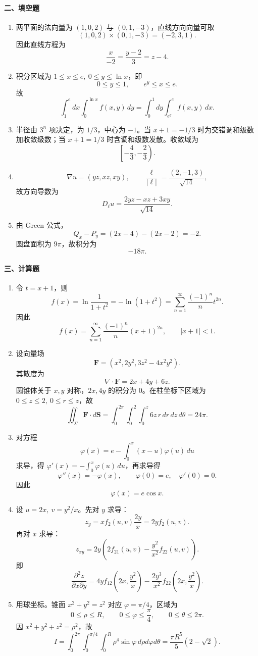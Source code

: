 \paragraph{二、填空题}
\begin{enumerate}
  \item 两平面的法向量为 $(1,0,2)$ 与 $(0,1,-3)$，直线方向向量可取
  \[
  (1,0,2)\times(0,1,-3)=(-2,3,1).
  \]
  因此直线方程为
  \[
  \frac{x}{-2}=\frac{y-2}{3}=z-4.
  \]
  \item 积分区域为 $1\le x\le e,\ 0\le y\le\ln x$，即
  \[
  0\le y\le1,\qquad e^y\le x\le e.
  \]
  故
  \[
  \int_1^e dx\int_0^{\ln x}f(x,y)\,dy
  =\int_0^1dy\int_{e^y}^e f(x,y)\,dx.
  \]
  \item 半径由 $3^n$ 项决定，为 $1/3$，中心为 $-1$。当 $x+1=-1/3$ 时为交错调和级数加收敛级数；当 $x+1=1/3$ 时含调和级数发散。收敛域为
  \[
  \left[-\frac43,-\frac23\right).
  \]
  \item
  \[
  \nabla u=(yz,xz,xy),\qquad
  \frac{\ell}{|\ell|}=\frac{(2,-1,3)}{\sqrt{14}},
  \]
  故方向导数为
  \[
  D_\ell u=\frac{2yz-xz+3xy}{\sqrt{14}}.
  \]
  \item 由 Green 公式，
  \[
  Q_x-P_y=(2x-4)-(2x-2)=-2.
  \]
  圆盘面积为 $9\pi$，故积分为
  \[
  -18\pi.
  \]
\end{enumerate}

\paragraph{三、计算题}
\begin{enumerate}
  \item 令 $t=x+1$，则
  \[
  f(x)=\ln\frac1{1+t^2}=-\ln(1+t^2)
  =\sum_{n=1}^{\infty}\frac{(-1)^n}{n}t^{2n}.
  \]
  因此
  \[
  f(x)=\sum_{n=1}^{\infty}\frac{(-1)^n}{n}(x+1)^{2n},\qquad |x+1|<1.
  \]
  \item 设向量场
  \[
  \mathbf F=(x^2,2y^2,3z^2-4x^2y^2).
  \]
  其散度为
  \[
  \nabla\cdot\mathbf F=2x+4y+6z.
  \]
  圆锥体关于 $x,y$ 对称，$2x,4y$ 的积分为 $0$。在柱坐标下区域为 $0\le z\le2,\ 0\le r\le z$，故
  \[
  \iint_{\Sigma}\mathbf F\cdot d\mathbf S
  =\int_0^{2\pi}\int_0^2\int_0^z6z\,r\,dr\,dz\,d\theta
  =24\pi.
  \]
  \item 对方程
  \[
  \varphi(x)=e-\int_0^x(x-u)\varphi(u)\,du
  \]
  求导，得 $\varphi'(x)=-\int_0^x\varphi(u)\,du$，再求导得
  \[
  \varphi''(x)=-\varphi(x),\qquad \varphi(0)=e,\quad \varphi'(0)=0.
  \]
  因此
  \[
  \varphi(x)=e\cos x.
  \]
  \item 设 $u=2x,\ v=y^2/x$。先对 $y$ 求导：
  \[
  z_y=x f_2(u,v)\frac{2y}{x}=2y f_2(u,v).
  \]
  再对 $x$ 求导：
  \[
  z_{xy}=2y\left(2f_{21}(u,v)-\frac{y^2}{x^2}f_{22}(u,v)\right).
  \]
  即
  \[
  \frac{\partial^2z}{\partial x\partial y}
  =4y f_{12}\left(2x,\frac{y^2}{x}\right)
  -\frac{2y^3}{x^2}f_{22}\left(2x,\frac{y^2}{x}\right).
  \]
  \item 用球坐标。锥面 $x^2+y^2=z^2$ 对应 $\varphi=\pi/4$，区域为
  \[
  0\le\rho\le R,\qquad 0\le\varphi\le\frac{\pi}{4},\qquad 0\le\theta\le2\pi.
  \]
  因 $x^2+y^2+z^2=\rho^2$，故
  \[
  I=\int_0^{2\pi}\int_0^{\pi/4}\int_0^R\rho^4\sin\varphi\,d\rho d\varphi d\theta
  =\frac{\pi R^5}{5}(2-\sqrt2).
  \]
\end{enumerate}

